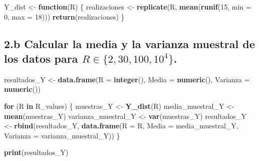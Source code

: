 \documentclass[
]{article}
\newenvironment{Shaded}{\begin{snugshade}}{\end{snugshade}}
\newcommand{\AttributeTok}[1]{\textcolor[rgb]{0.13,0.29,0.53}{#1}}
\newcommand{\ControlFlowTok}[1]{\textcolor[rgb]{0.13,0.29,0.53}{\textbf{#1}}}
\newcommand{\DecValTok}[1]{\textcolor[rgb]{0.00,0.00,0.81}{#1}}
\newcommand{\FunctionTok}[1]{\textcolor[rgb]{0.13,0.29,0.53}{\textbf{#1}}}
\newcommand{\NormalTok}[1]{#1}
\newcommand{\OtherTok}[1]{\textcolor[rgb]{0.56,0.35,0.01}{#1}}
\begin{document}
\begin{Shaded}
\begin{Highlighting}[]
\NormalTok{Y\_dist }\OtherTok{\textless{}{-}} \ControlFlowTok{function}\NormalTok{(R) \{}
\NormalTok{  realizaciones }\OtherTok{\textless{}{-}} \FunctionTok{replicate}\NormalTok{(R, }\FunctionTok{mean}\NormalTok{(}\FunctionTok{runif}\NormalTok{(}\DecValTok{15}\NormalTok{, }\AttributeTok{min =} \DecValTok{0}\NormalTok{, }\AttributeTok{max =} \DecValTok{18}\NormalTok{)))}
  \FunctionTok{return}\NormalTok{(realizaciones)}
\NormalTok{\}}
\end{Highlighting}
\end{Shaded}

\subsection{\texorpdfstring{2.b Calcular la media y la varianza muestral
de los datos para
\(R \in \{2, 30, 100, 10^4\}\).}{2.b Calcular la media y la varianza muestral de los datos para R \textbackslash in \textbackslash\{2, 30, 100, 10\^{}4\textbackslash\}.}}\label{b-calcular-la-media-y-la-varianza-muestral-de-los-datos-para-r-in-2-30-100-104.-1}

\begin{Shaded}
\begin{Highlighting}[]
\NormalTok{resultados\_Y }\OtherTok{\textless{}{-}} \FunctionTok{data.frame}\NormalTok{(}\AttributeTok{R =} \FunctionTok{integer}\NormalTok{(), }\AttributeTok{Media =} \FunctionTok{numeric}\NormalTok{(), }\AttributeTok{Varianza =} \FunctionTok{numeric}\NormalTok{())}

\ControlFlowTok{for}\NormalTok{ (R }\ControlFlowTok{in}\NormalTok{ R\_values) \{}
\NormalTok{  muestras\_Y }\OtherTok{\textless{}{-}} \FunctionTok{Y\_dist}\NormalTok{(R)}
\NormalTok{  media\_muestral\_Y }\OtherTok{\textless{}{-}} \FunctionTok{mean}\NormalTok{(muestras\_Y)}
\NormalTok{  varianza\_muestral\_Y }\OtherTok{\textless{}{-}} \FunctionTok{var}\NormalTok{(muestras\_Y)}
\NormalTok{  resultados\_Y }\OtherTok{\textless{}{-}} \FunctionTok{rbind}\NormalTok{(resultados\_Y, }\FunctionTok{data.frame}\NormalTok{(}\AttributeTok{R =}\NormalTok{ R, }\AttributeTok{Media =}\NormalTok{ media\_muestral\_Y, }\AttributeTok{Varianza =}\NormalTok{ varianza\_muestral\_Y))}
\NormalTok{\}}

\FunctionTok{print}\NormalTok{(resultados\_Y)}
\end{Highlighting}
\end{Shaded}
\end{document}
